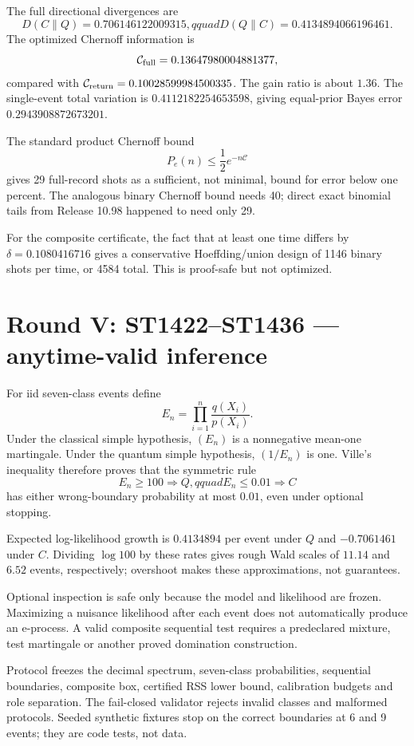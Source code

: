 \documentclass[11pt,a4paper]{article}
\begin{document}
The full directional divergences are
\[
D(C\|Q)=0.706146122009315,qquad
D(Q\|C)=0.4134894066196461.
\]
The optimized Chernoff information is
\[
\mathcal C_{\rm full}=0.13647980004881377,
\]
compared with
$\mathcal C_{\rm return}=0.10028599984500335$.  The gain ratio is about $1.36$.
The single-event total variation is $0.4112182254653598$, giving equal-prior
Bayes error $0.2943908872673201$.

The standard product Chernoff bound
\[
P_e(n)\le\frac12e^{-n\mathcal C}
\]
gives 29 full-record shots as a sufficient, not minimal, bound for error below
one percent.  The analogous binary Chernoff bound needs 40; direct exact
binomial tails from Release 10.98 happened to need only 29.

For the composite certificate, the fact that at least one time differs by
$\delta=0.1080416716$ gives a conservative Hoeffding/union design of 1146
binary shots per time, or 4584 total.  This is proof-safe but not optimized.

\section{Round V: ST1422--ST1436 --- anytime-valid inference}

For iid seven-class events define
\[
E_n=\prod_{i=1}^n\frac{q(X_i)}{p(X_i)}.
\]
Under the classical simple hypothesis, $(E_n)$ is a nonnegative mean-one
martingale.  Under the quantum simple hypothesis, $(1/E_n)$ is one.  Ville's
inequality therefore proves that the symmetric rule
\[
E_n\ge100\Rightarrow Q,qquad
E_n\le0.01\Rightarrow C
\]
has either wrong-boundary probability at most $0.01$, even under optional
stopping.

Expected log-likelihood growth is $0.4134894$ per event under $Q$ and
$-0.7061461$ under $C$.  Dividing $\log100$ by these rates gives rough Wald
scales of $11.14$ and $6.52$ events, respectively; overshoot makes these
approximations, not guarantees.

Optional inspection is safe only because the model and likelihood are frozen.
Maximizing a nuisance likelihood after each event does not automatically
produce an e-process.  A valid composite sequential test requires a
predeclared mixture, test martingale or another proved domination construction.

Protocol  freezes the decimal
spectrum, seven-class probabilities, sequential boundaries, composite box,
certified RSS lower bound, calibration budgets and role separation.  The
fail-closed validator rejects invalid classes and malformed protocols.  Seeded
synthetic fixtures stop on the correct boundaries at 6 and 9 events; they are
code tests, not data.
\end{document}
